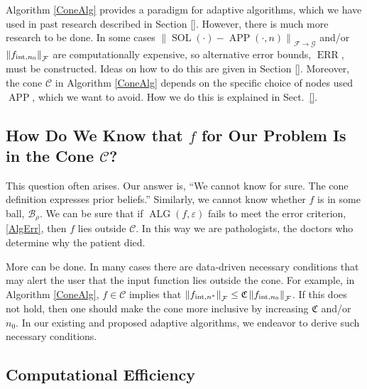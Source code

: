 \documentclass[11pt]{NSFamsart}
\DeclareMathOperator{\SOL}{SOL}
\DeclareMathOperator{\APP}{APP}
\DeclareMathOperator{\ALG}{ALG}
\DeclareMathOperator{\ERR}{ERR}
\newcommand{\cb}{\mathcal{B}}
\newcommand{\calc}{{\mathcal{C}}}
\newcommand{\calf}{{\mathcal{F}}}
\newcommand{\calg}{{\mathcal{G}}}
\newcommand{\fC}{\mathfrak{C}}
\newcommand{\norm}[2][{}]{\ensuremath{\left \lVert #2 \right \rVert}_{#1}}
\newcommand{\inflate}{\fC}
\begin{document}
Algorithm \ref{ConeAlg} provides a paradigm for adaptive algorithms, which we have used in past research described in Section \ref{}.  However, there is much more research to be done. In some cases $\norm[\calf \to \calg]{\SOL(\cdot) - \APP(\cdot,n)}$ and/or $\norm[\calf]{f_{\textup{int},n_0}}$ are computationally expensive, so alternative error bounds, $\ERR$, must be constructed.  Ideas on how to do this are given in Section \ref{}.  Moreover, the cone $\calc$ in Algorithm \ref{ConeAlg} depends on the specific choice of nodes used $\APP$, which we want to avoid.  How we do this is explained in Sect.\ \ref{}.

\subsection{How Do We Know that $f$ for Our Problem Is in the Cone $\calc$?} \label{sec:HowKnow}  

This question often arises.  Our answer is, ``We cannot know for sure.  The cone definition expresses prior beliefs.''  Similarly, we cannot know whether $f$ is in some ball, $\cb_{\rho}$.  We can be sure that if $\ALG(f,\varepsilon)$ fails to meet the error criterion, \eqref{AlgErr}, then $f$ lies outside $\calc$.  In this way we are pathologists, the doctors who determine why the patient died.

More can be done.  In many cases there are data-driven necessary conditions that may alert the user that the input function lies outside the cone.  For example, in Algorithm \ref{ConeAlg}, $f \in \calc$ implies that $\norm[\calf]{f_{\textup{int},n^*}} \le \inflate \norm[\calf]{f_{\textup{int},n_0}}$.  If this does not hold, then one should make the cone more inclusive by increasing $\inflate$ and/or $n_0$.  In our existing and proposed adaptive algorithms,  we endeavor to derive such necessary conditions.

\subsection{Computational Efficiency} \label{sec:CompEff}
\end{document}
